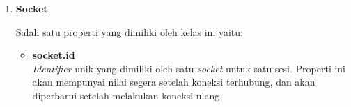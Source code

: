 \begin{enumerate}
%		

	
	\item \textbf{Socket}
	
	Salah satu properti yang dimiliki oleh kelas ini yaitu:
	
	\begin{itemize}
		\item \textbf{socket.id} \\ \textit{Identifier} unik yang dimiliki oleh satu \textit{socket} untuk satu sesi. Properti ini akan mempunyai nilai segera setelah koneksi terhubung, dan akan diperbarui setelah melakukan koneksi ulang.
	\end{itemize}
	

\end{enumerate}
